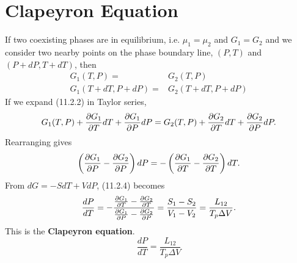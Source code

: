         \section{Clapeyron Equation}
            If two coexisting phases are in equilibrium, i.e. $\mu_1=\mu_2$ and $G_1=G_2$ and we consider two nearby points on the phase boundary line, $(P,T)$ and $(P+dP,T+dT)$, then
            \begin{align}
                G_1(T,P) =& G_2(T,P) \\
                G_1(T+dT,P+dP) =& G_2(T+dT,P+dP)
            \end{align}
            If we expand (11.2.2) in Taylor series,
            \begin{equation}
                G_1(T,P) + \frac{\partial G_1}{\partial T} dT + \frac{\partial G_1}{\partial P}dP = G_2(T,P)+\frac{\partial G_2}{\partial T}dT + \frac{\partial G_2}{\partial P}dP.
            \end{equation}
            Rearranging gives
            \begin{equation}
                \left( \frac{\partial G_1}{\partial P}-\frac{\partial G_2}{\partial P} \right)dP = -\left( \frac{\partial G_1}{\partial T}-\frac{\partial G_2}{\partial T} \right)dT.
            \end{equation}
            From $dG = -SdT + VdP$, (11.2.4) becomes
            \begin{equation}
                \frac{dP}{dT}=-\frac{\frac{\partial G_1}{\partial T}-\frac{\partial G_2}{\partial T}}{\frac{\partial G_1}{\partial P}-\frac{\partial G_2}{\partial P}} = \frac{S_1-S_2}{V_1-V_2} = \frac{L_{12}}{T_p\Delta V}.
            \end{equation}
            This is the \textbf{Clapeyron equation}.
            \begin{equation}
                \frac{dP}{dT} = \frac{L_{12}}{T_p\Delta V}
            \end{equation}


